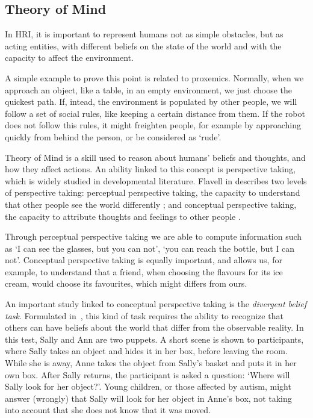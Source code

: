 \subsection{Theory of Mind}
In HRI, it is important to represent humans not as simple obstacles, but as acting entities, with different beliefs on the state of the world and with the capacity to affect the environment. 

A simple example to prove this point is related to proxemics. Normally, when we approach an object, like a table, in an empty environment, we just choose the quickest path. If, intead, the environment is populated by other people, we will follow a set of social rules, like keeping a certain distance from them. If the robot does not follow this rules, it might freighten people, for example by approaching quickly from behind the person, or be considered as `rude'.

Theory of Mind \cite{premack1978does} is a skill used to reason about humans' beliefs and thoughts, and how they affect actions. An ability linked to this concept is perspective taking, which is widely studied in developmental literature.  Flavell in \cite{flavell1977development} describes two levels of perspective taking: 
perceptual perspective taking, the capacity to understand that other people see the world differently \cite{Tversky1999}; and conceptual perspective taking, the capacity to attribute thoughts and feelings to other people \cite{Baron1985}. 

Through perceptual perspective taking we are able to compute information such as `I can see the glasses, but you can not', `you can reach the bottle, but I can not'. Conceptual perspective taking is equally important, and allows us, for example, to understand that a friend, when choosing the flavours for its ice cream, would choose its favourites, which might differs from ours.

An important study linked to conceptual perspective taking is the \textit{divergent belief task}.  Formulated in~\cite{wimmer1983}, this kind of task requires the ability to recognize that others can have beliefs about the world that differ from the observable reality.  In this test, Sally and Ann are two puppets. A short scene is shown to participants, where Sally takes an object and hides it in her box, before leaving the room. While she is away, Anne takes the object from Sally's basket and puts it in her own box. After Sally returns, the participant is asked a question: `Where will Sally look for her object?'. Young children, or those affected by autism, might answer (wrongly) that Sally will look for her object in Anne's box, not taking into account that she does not know that it was moved.

